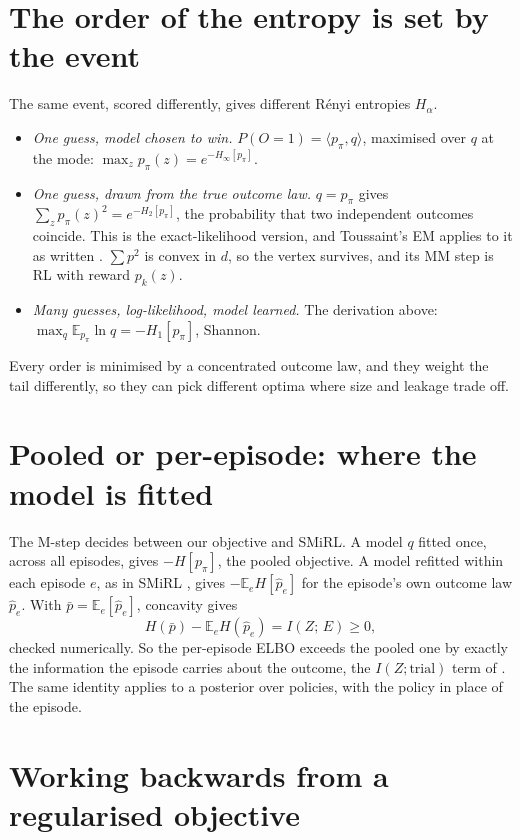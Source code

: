 \documentclass[10pt]{article}
\newcommand{\E}{\mathbb E}
\begin{document}
\section{The order of the entropy is set by the event}

The same event, scored differently, gives different Rényi entropies $H_\alpha$.
\begin{itemize}
\item \emph{One guess, model chosen to win.} $P(O=1) = \langle p_\pi, q\rangle$, maximised over $q$ at the mode: $\max_z p_\pi(z) = e^{-H_\infty[p_\pi]}$.
\item \emph{One guess, drawn from the true outcome law.} $q = p_\pi$ gives $\sum_z p_\pi(z)^2 = e^{-H_2[p_\pi]}$, the probability that two independent outcomes coincide. This is the exact-likelihood version, and Toussaint's EM applies to it as written \citep{Toussaint-probabilistic06,Toussaint-expectation11}. $\sum p^2$ is convex in $d$, so the vertex survives, and its MM step is RL with reward $p_k(z)$.
\item \emph{Many guesses, log-likelihood, model learned.} The derivation above: $\max_q \E_{p_\pi} \ln q = -H_1[p_\pi]$, Shannon.
\end{itemize}
Every order is minimised by a concentrated outcome law, and they weight the tail differently, so they can pick different optima where size and leakage trade off.

\section{Pooled or per-episode: where the model is fitted}

The M-step decides between our objective and SMiRL. A model $q$ fitted once, across all episodes, gives $-H[p_\pi]$, the pooled objective. A model refitted within each episode $e$, as in SMiRL \citep{Berseth-smirl21}, gives $-\E_e H[\hat p_e]$ for the episode's own outcome law $\hat p_e$. With $\bar p = \E_e[\hat p_e]$, concavity gives
\begin{equation}
  H(\bar p) - \E_e H(\hat p_e) = I(Z;\, E) \ge 0,
\end{equation}
checked numerically. So the per-episode ELBO exceeds the pooled one by exactly the information the episode carries about the outcome, the $I(Z;\text{trial})$ term of \citet{Mutti-convex23}. The same identity applies to a posterior over policies, with the policy in place of the episode.

\section{Working backwards from a regularised objective}
\end{document}
